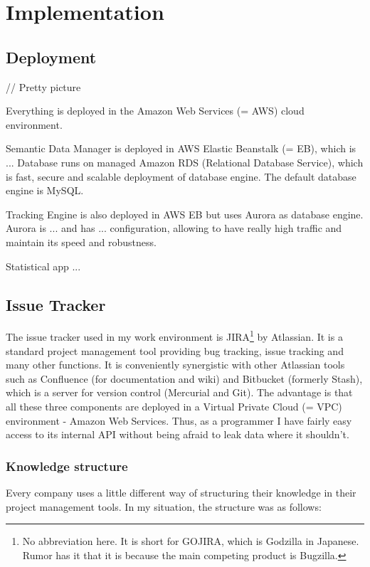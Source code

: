 \chapter{Implementation}

\section{Deployment}
// Pretty picture

Everything is deployed in the Amazon Web Services (= AWS) cloud environment.

Semantic Data Manager is deployed in AWS Elastic Beanstalk (= EB), which is ... Database runs on managed Amazon RDS (Relational Database Service), which is fast, secure and scalable deployment of database engine. The default database engine is MySQL.

Tracking Engine is also deployed in AWS EB but uses Aurora as database engine. Aurora is ... and has ... configuration, allowing to have really high traffic and maintain its speed and robustness.

Statistical app ...

\section{Issue Tracker}

The issue tracker used in my work environment is JIRA\footnote{No abbreviation here. It is short for GOJIRA, which is Godzilla in Japanese. Rumor has it that it is because the main competing product is Bugzilla.} by Atlassian. It is a standard project management tool providing bug tracking, issue tracking and many other functions. It is conveniently synergistic with other Atlassian tools such as Confluence (for documentation and wiki) and Bitbucket (formerly Stash), which is a server for version control (Mercurial and Git). The advantage is that all these three components are deployed in a Virtual Private Cloud (= VPC) environment - Amazon Web Services. Thus, as a programmer I have fairly easy access to its internal API without being afraid to leak data where it shouldn't.

\subsection{Knowledge structure}

Every company uses a little different way of structuring their knowledge in their project management tools. In my situation, the structure was as follows:

